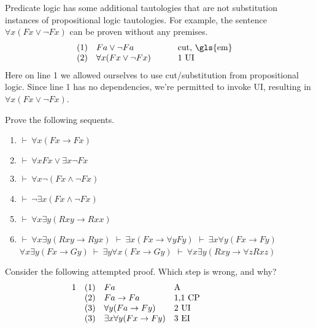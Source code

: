 Predicate logic has some additional tautologies that are not
substitution instances of propositional logic tautologies.  For
example, the sentence $\forall x(Fx\vee \neg Fx)$ can be proven
without any premises.
\[ \begin{array}{l l >{$}p{3cm}<{$} p{3cm}}
    & (1) & Fa\vee \neg Fa   & cut, \gls{em} \\
    & (2) & \forall x(Fx\vee\neg Fx) & 1 UI \end{array} \] Here on
line 1 we allowed ourselves to use cut/substitution from propositional
logic.  Since line 1 has no dependencies, we're permitted to invoke
UI, resulting in $\forall x(Fx\vee\neg Fx)$.

\begin{exercises} Prove the following sequents.
  \begin{enumerate}
  \item $\vdash\:\forall x(Fx\to Fx)$
  \item $\vdash\:\forall xFx \vee \exists x \neg Fx$  
  \item $\vdash\:\forall x\neg (Fx\wedge \neg Fx)$
  \item $\vdash\:\neg\exists x (Fx\wedge\neg Fx)$
  \item $\vdash\: \forall x\exists y(Rxy\to Rxx)$
  \item $\vdash\:\forall x \exists y (Rxy \to Ryx)$  
  \sitem $\vdash\:\exists x(Fx\to \forall yFy)$  
  \sitem $\vdash\:\exists x\forall y(Fx\to Fy)$
  \sitem $\forall x \exists y (Fx \to Gy) \:\vdash\:\exists y\forall x
  (Fx\to Gy) $
  \sitem $\vdash\:\forall x\exists y(Rxy\to \forall zRxz)$
\end{enumerate} \end{exercises}

\begin{exercises} Consider the following attempted proof.  Which step
  is wrong, and why?
  \[ \begin{array}{l l l p{3cm}}
    1  & (1) & Fa & A \\
       & (2) & Fa\to Fa & 1,1 CP \\
       & (3) & \forall y(Fa\to Fy) & 2 UI \\
       & (3) & \exists x\forall y(Fx\to Fy) & 3 EI \end{array} \]
\end{exercises}





